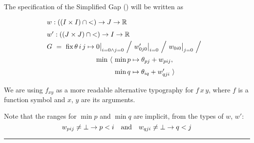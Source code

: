 \exampleTitle
\begin{comment}\subsection{Example}\end{comment}

The specification of the Simplified Gap () will be written as
%
\begin{equation}
  \renewcommand\arraystretch{1.5}
  \begin{array}{@{}l@{}l@{}l@{}}
    \lspan3{w : ((I\times I)\cap{<})\to J\to\R} \\
    \lspan3{w' : ((J\times J)\cap{<})\to I\to\R} \\
    G ~=~ \fix \theta\,i\,j\mapsto{}
      & \lspan2{0\big|_{i=0\land j=0} ~\Big/~ w'_{0j0}\big|_{i=0} ~\Big/~ w_{0i0}\big|_{j=0} ~\Big/~} \\
      & \min~\langle~ & \min p\mapsto\theta_{pj}+w_{pij}, \\
      & & \min q\mapsto\theta_{iq}+w'_{qji} ~\rangle
  \end{array}
  \label{lang:arbiter spec}
\end{equation}

\medskip
We are using $f_{xy}$
as a more readable alternative typography for $f\,x\,y$,
where $f$ is a function symbol and $x$, $y$ are its arguments.

Note that the ranges for $\min p$ and $\min q$ are implicit, from the types of
$w$, $w'$: \[w_{pij}\neq\bot\rightarrow p<i \quad \mbox{and} \quad w_{qji}\neq\bot\rightarrow q<j\]

\medskip
\hrule
